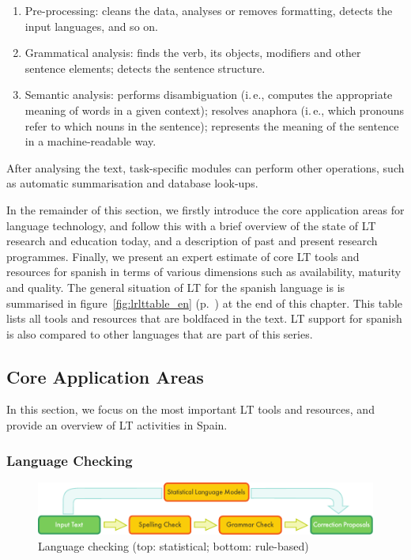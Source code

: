 \begin{multicols}{2}
\begin{enumerate}
\item Pre-processing: cleans the data, analyses or removes formatting, detects the input languages, and so on.
\item Grammatical analysis: finds the verb, its objects, modifiers and other sentence elements; detects the sentence structure.
\item Semantic analysis: performs disambiguation (i.\,e., computes the appropriate meaning of words in a given context); resolves anaphora (i.\,e., which pronouns refer to which nouns in the sentence); represents the meaning of the sentence in a machine-readable way.
\end{enumerate}

After analysing the text, task-specific modules can perform other operations, such as automatic summarisation and database look-ups.

In the remainder of this section, we firstly introduce the core application areas for language technology, and follow this with a brief overview of the state of LT research and education today, and a description of past and present research programmes. Finally, we present an expert estimate of core LT tools and resources for spanish in terms of various dimensions such as availability, maturity and quality. The general situation of LT for the spanish language is is summarised in figure~\ref{fig:lrlttable_en} (p.~\pageref{fig:lrlttable_en}) at the end of this chapter. This table lists all tools and resources that are boldfaced in the text. LT support for spanish is also compared to other languages that are part of this series.

\subsection{Core Application Areas}

In this section, we focus on the most important LT tools and resources, and provide an overview of LT activities in Spain.

\subsubsection{Language Checking}

\begin{figure}[t]
  \center
  \includegraphics[width=\textwidth]{../_media/english/language_checking}
  \caption{Language checking (top: statistical; bottom: rule-based)}
  \label{fig:langcheckingaarch_en}
\end{figure}


\end{multicols}
